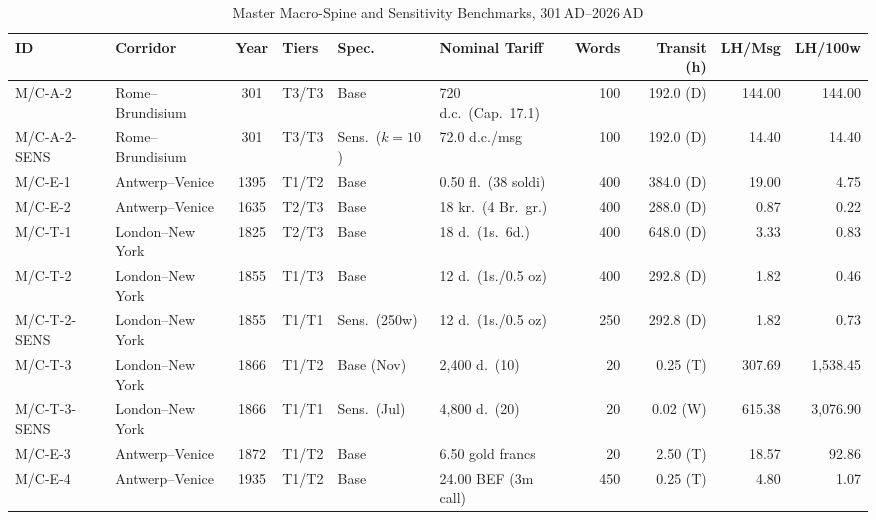 \documentclass[11pt,a4paper]{article}
\newcommand{\gbp}{\symbol{"00A3}}
\newcommand{\lhBEeighteenMsg}{18.57}
\newcommand{\lhBEeighteenHundred}{92.86}
\newcommand{\lhBEnineteenMsg}{4.80}
\newcommand{\lhBEnineteenHundred}{1.07}
\begin{document}
\begin{table}[htbp]
\centering
\scriptsize
\begin{threeparttable}
\caption{Master Macro-Spine and Sensitivity Benchmarks, 301\,AD--2026\,AD}
\label{tab:master_spine}
\setlength{\tabcolsep}{2.2pt}
\begin{tabular}{@{}llclllrrrr@{}}
\toprule
\textbf{ID} & \textbf{Corridor} & \textbf{Year} & \textbf{Tiers}\tnote{a} & \textbf{Spec.} & \textbf{Nominal Tariff} & \textbf{Words} & \textbf{Transit (h)}\tnote{b} & \textbf{LH/Msg} & \textbf{LH/100w} \\
\midrule
M/C-A-2      & Rome--Brundisium  & 301  & T3/T3 & Base\tnote{c}  & 720 d.c.\ (Cap.\ 17.1) & 100    & 192.0 (D)      & 144.00               & 144.00 \\
M/C-A-2-SENS & Rome--Brundisium  & 301  & T3/T3 & Sens.\ ($k{=}10$) & 72.0 d.c./msg      & 100    & 192.0 (D)      & 14.40                & 14.40 \\
\addlinespace[2pt]
M/C-E-1      & Antwerp--Venice   & 1395 & T1/T2 & Base           & 0.50 fl.\ (38 soldi)  & 400    & 384.0 (D)      & 19.00                & 4.75 \\
M/C-E-2      & Antwerp--Venice   & 1635 & T2/T3 & Base           & 18 kr.\ (4 Br.\ gr.)  & 400    & 288.0 (D)      & 0.87                 & 0.22 \\
\addlinespace[2pt]
M/C-T-1      & London--New York  & 1825 & T2/T3 & Base           & 18 d.\ (1s.\ 6d.)     & 400    & 648.0 (D)      & 3.33                 & 0.83 \\
M/C-T-2      & London--New York  & 1855 & T1/T3 & Base           & 12 d.\ (1s./0.5 oz)   & 400    & 292.8 (D)      & 1.82                 & 0.46 \\
M/C-T-2-SENS & London--New York  & 1855 & T1/T1 & Sens.\ (250w)  & 12 d.\ (1s./0.5 oz)   & 250    & 292.8 (D)      & 1.82                 & 0.73 \\
\addlinespace[2pt]
M/C-T-3      & London--New York  & 1866 & T1/T2 & Base (Nov)     & 2,400 d.\ (\gbp 10)   & 20     & 0.25 (T)       & 307.69               & 1,538.45 \\
M/C-T-3-SENS & London--New York  & 1866 & T1/T1 & Sens.\ (Jul)   & 4,800 d.\ (\gbp 20)   & 20     & 0.02 (W)       & 615.38               & 3,076.90 \\
\addlinespace[2pt]
M/C-E-3      & Antwerp--Venice   & 1872 & T1/T2 & Base\tnote{d}  & 6.50 gold francs      & 20     & 2.50 (T)       & \lhBEeighteenMsg     & \lhBEeighteenHundred \\
M/C-E-4      & Antwerp--Venice   & 1935 & T1/T2 & Base\tnote{d}  & 24.00 BEF (3m call)   & 450    & 0.25 (T)       & \lhBEnineteenMsg     & \lhBEnineteenHundred \\

\end{tabular}
\end{threeparttable}
\end{table}
\end{document}

